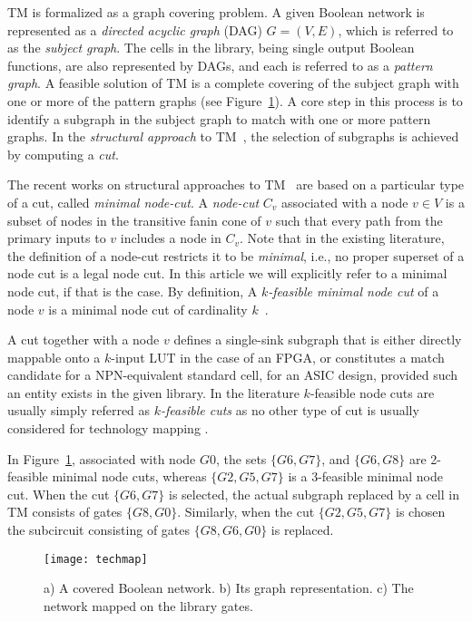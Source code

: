 \documentclass[journal]{IEEEtran}
\begin{document}
TM is formalized as a graph covering problem. A given Boolean network is represented as a \emph{directed acyclic graph} (DAG) $G = (V,E)$, which is referred to as the \emph{subject graph}.  The cells in the library, being single output Boolean functions, are also represented by DAGs, and each is referred to as a \textit{pattern graph}.  A feasible solution of TM is a complete covering of the subject graph with one or more of the pattern graphs (see Figure~\ref{fig:covering}). A core step in this process is to identify a subgraph in the subject graph to match with one or more pattern graphs. In the \emph{structural approach} to TM~\cite{chatterjee_thesis07}, the selection of subgraphs is achieved by computing a \emph{cut}.

The recent works on structural approaches to TM~\cite{Mishchenko2007,Chatterjee2006,Cong1999,Ling2007} are based on a particular type of a cut, called \emph{minimal node-cut}.  A \emph{node-cut} $C_v$ associated with a node $v \in V$ is a subset of nodes in the transitive fanin cone of $v$ such that every path from the primary inputs to $v$ includes a node in $C_v$. Note that in the existing literature, the definition of a node-cut restricts it to be \textit{minimal}, i.e., no proper superset of a node cut is a legal node cut. In this article we will explicitly refer to a minimal node cut, if that is the case. By definition, A \emph{$k$-feasible minimal node cut} of a node $v$ is a minimal node cut of cardinality $k$~\cite{Chatterjee2006}. 

A cut together with a node $v$ defines a single-sink subgraph that is either directly mappable onto a $k$-input LUT in the case of an FPGA,  or constitutes a match candidate for a NPN-equivalent standard cell, for an ASIC design, provided such an entity exists in the given library. In the literature $k$-feasible node cuts are usually simply referred as \emph{$k$-feasible cuts} as no other type of cut is usually considered for technology mapping \cite{Mishchenko2007,Chatterjee2006,Cong1999,Ling2007}.  

In Figure~\ref{fig:covering}, associated with node $G0$,  the sets $\{G6, G7\}$, and $\{G6, G8\}$ are 2-feasible minimal node cuts, whereas $\{G2, G5, G7\}$ is a 3-feasible minimal node cut. When the cut $\{G6, G7\}$ is selected, the actual subgraph replaced by a cell in TM consists of gates $\{G8,G0\}$.  Similarly, when the cut $\{G2, G5, G7\}$ is chosen the subcircuit consisting of gates $\{G8,G6,G0\}$ is replaced.

\begin{figure}[h]
\centering
\texttt{[image: techmap]}
\caption{a) A covered Boolean network. b) Its graph representation. c)   The network mapped on the library gates.}
\label{fig:covering}
\end{figure}
\end{document}
